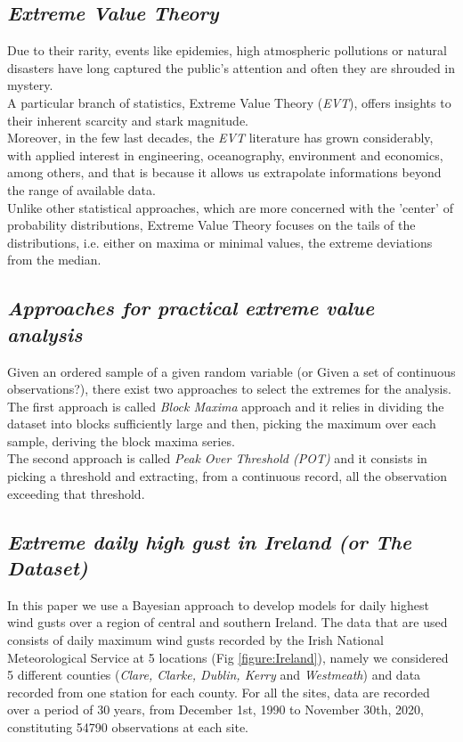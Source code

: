 \documentclass[preprint,12pt]{elsarticle}
\begin{document}
\subsection{\textit{Extreme Value Theory}}
Due to their rarity, events like epidemies, high atmospheric pollutions or natural disasters have long captured the public's attention and often they are shrouded in mystery.\\
A particular branch of statistics, Extreme Value Theory (\textit{EVT}), offers insights to their inherent scarcity and stark magnitude. \\
Moreover, in the few last decades, the \textit{EVT} literature has grown considerably, with applied interest in engineering, oceanography, environment and economics, among others, and that is because it allows us extrapolate informations beyond the range of available data.
\\
Unlike other statistical approaches, which are more concerned with the 'center' of probability distributions, Extreme Value Theory focuses on the tails of the distributions, i.e. either on maxima or minimal values, the extreme deviations from the median.


\subsection{\textit{Approaches for practical extreme value analysis }}
Given an ordered sample of a given random variable (or Given a set of continuous observations?), there exist two approaches to select the extremes for the analysis.
\\ 
The first approach is called \textit{Block Maxima} approach and it relies in dividing the dataset into blocks sufficiently large and then, picking the maximum over each sample, deriving the block maxima series.
\\
The second approach is called \textit{Peak Over Threshold (POT)} and it consists in picking a threshold and extracting, from a continuous record, all the observation exceeding that threshold.

\subsection{\textit{Extreme daily high gust in Ireland (or The Dataset)}}

In this paper we use a Bayesian approach to develop models  for daily highest wind gusts over a region
of central and southern Ireland. The data that are used consists of daily maximum wind gusts recorded by the Irish National Meteorological Service at 5 locations (Fig \ref{figure:Ireland}), namely we considered 5 different counties (\textit{Clare, Clarke, Dublin, Kerry} and \textit{Westmeath}) and data recorded from one station for each county. 
For all the sites, data are recorded over a period of 30 years, from December 1st, 1990 to November 30th, 2020, constituting 54790 observations at each site.
\end{document}

